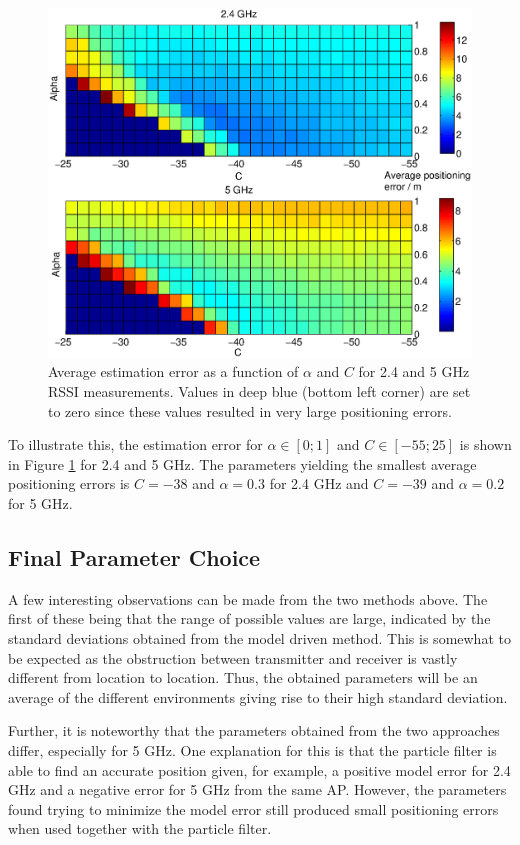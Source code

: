 \documentclass{LTHthesis}
\begin{document}
\begin{figure}[!hbt]

\includegraphics[width=1\textwidth ]{images/pure_rssi/err_vs_param}
\caption{Average estimation error as a function of $\alpha$ and $C$ for 2.4 and 5 GHz RSSI measurements. Values in deep blue (bottom left corner) are set to zero since these values resulted in very large positioning errors.}\label{err_vs_param}
\end{figure}
%
To illustrate this, the estimation error for $\alpha \in [0;1]$ and $C \in [-55;25]$ is shown in Figure \ref{err_vs_param} for 2.4 and 5 GHz. The parameters yielding the smallest average positioning errors is $C=-38$ and $\alpha = 0.3$ for 2.4 GHz and $C=-39$ and $\alpha = 0.2$ for 5 GHz. 
%
\subsection{Final Parameter Choice}
%
A few interesting observations can be made from the two methods above. The first of these being that the range of possible values are large, indicated by the standard deviations obtained from the model driven method. This is somewhat to be expected as the obstruction between transmitter and receiver is vastly different from location to location. Thus, the obtained parameters will be an average of the different environments giving rise to their high standard deviation. 

Further, it is noteworthy that the parameters obtained from the two approaches differ, especially for 5 GHz. One explanation for this is that the particle filter is able to find an accurate position given, for example, a positive model error for 2.4 GHz and a negative error for 5 GHz from the same AP. However, the parameters found trying to minimize the model error still produced small positioning errors when used together with the particle filter. 
\end{document}
